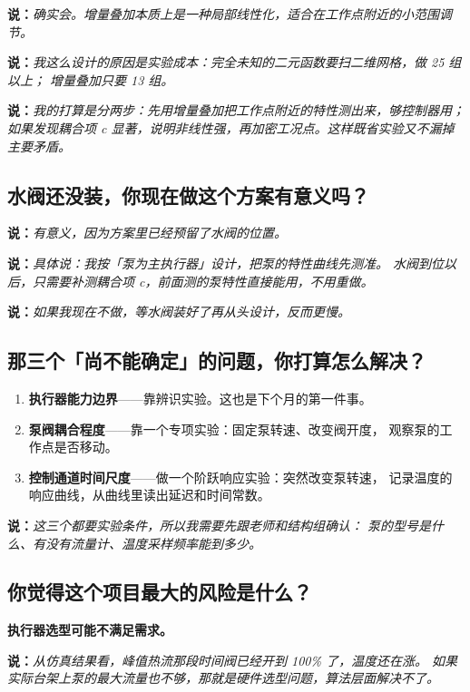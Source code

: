 \documentclass[11pt,a4paper]{ctexart}
\newcommand{\shuo}[1]{\par{\color{cBlue}\bfseries 说：}{\itshape #1}\par}
\begin{document}
\shuo{确实会。增量叠加本质上是一种局部线性化，适合在工作点附近的小范围调节。}

\shuo{我这么设计的原因是实验成本：完全未知的二元函数要扫二维网格，做 25 组以上；
增量叠加只要 13 组。}

\shuo{我的打算是分两步：先用增量叠加把工作点附近的特性测出来，够控制器用；
如果发现耦合项 c 显著，说明非线性强，再加密工况点。这样既省实验又不漏掉主要矛盾。}

\subsection{水阀还没装，你现在做这个方案有意义吗？}

\shuo{有意义，因为方案里已经预留了水阀的位置。}

\shuo{具体说：我按「泵为主执行器」设计，把泵的特性曲线先测准。
水阀到位以后，只需要补测耦合项 c，前面测的泵特性直接能用，不用重做。}

\shuo{如果我现在不做，等水阀装好了再从头设计，反而更慢。}

\subsection{那三个「尚不能确定」的问题，你打算怎么解决？}

\begin{enumerate}
  \item \textbf{执行器能力边界}——靠辨识实验。这也是下个月的第一件事。
  \item \textbf{泵阀耦合程度}——靠一个专项实验：固定泵转速、改变阀开度，
        观察泵的工作点是否移动。
  \item \textbf{控制通道时间尺度}——做一个阶跃响应实验：突然改变泵转速，
        记录温度的响应曲线，从曲线里读出延迟和时间常数。
\end{enumerate}

\shuo{这三个都要实验条件，所以我需要先跟老师和结构组确认：
泵的型号是什么、有没有流量计、温度采样频率能到多少。}

\subsection{你觉得这个项目最大的风险是什么？}

\begin{yaodian}
\textbf{执行器选型可能不满足需求。}
\end{yaodian}

\shuo{从仿真结果看，峰值热流那段时间阀已经开到 100\% 了，温度还在涨。
如果实际台架上泵的最大流量也不够，那就是硬件选型问题，算法层面解决不了。}
\end{document}
